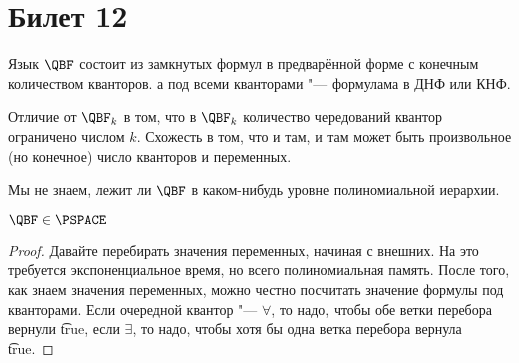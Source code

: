 \setcounter{section}{11}
\section{Билет 12}
	\begin{Def}
		Язык $\QBF$ состоит из замкнутых формул в предварённой форме с конечным количеством кванторов.
		а под всеми кванторами "--- формулама в ДНФ или КНФ.
	\end{Def}
	\begin{Rem}
		Отличие от $\QBF_k$ в том, что в $\QBF_k$ количество чередований квантор ограничено числом $k$.
		Схожесть в том, что и там, и там может быть произвольное (но конечное) число кванторов и переменных.
	\end{Rem}
	\begin{Rem}
		Мы не знаем, лежит ли $\QBF$ в каком-нибудь уровне полиномиальной иерархии.
	\end{Rem}

	\begin{lemma}
		$\QBF \in \PSPACE$
	\end{lemma}
	\begin{proof}
		Давайте перебирать значения переменных, начиная с внешних.
		На это требуется экспоненциальное время, но всего полиномиальная память.
		После того, как знаем значения переменных, можно честно посчитать значение формулы под кванторами.
		Если очередной квантор "--- $\forall$, то надо, чтобы обе ветки перебора вернули \t{true},
		если $\exists$, то надо, чтобы хотя бы одна ветка перебора вернула \t{true}.
	\end{proof}

